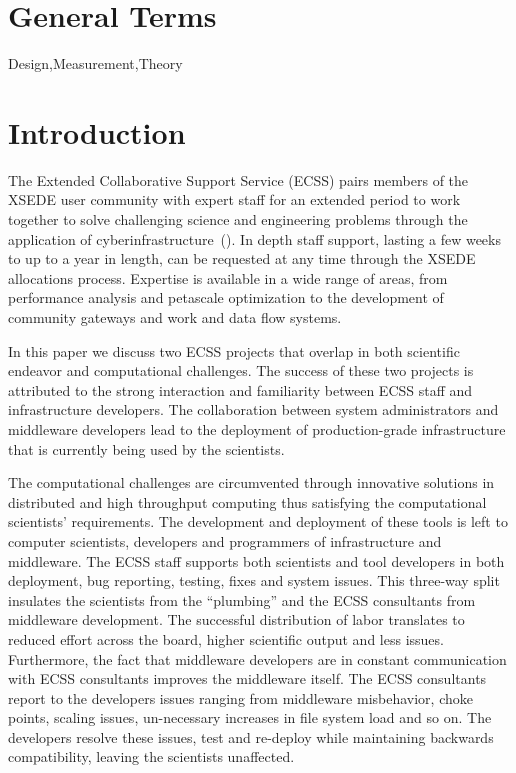 \documentclass{sig-alternate}
\begin{document}

\section*{General Terms}{Design,Measurement,Theory}

 \keywords{}

\section{Introduction}

The Extended Collaborative Support Service (ECSS) pairs members of the XSEDE
user community with expert staff for an extended period to work together to
solve challenging science and engineering problems through the application of
cyberinfrastructure~(\cite{ECSS_webpage}). In depth staff support, lasting a few
weeks to up to a year in length, can be requested at any time through the XSEDE
allocations process. Expertise is available in a wide range of areas, from
performance analysis and petascale optimization to the development of community
gateways and work and data flow systems.

In this paper we discuss two ECSS projects that overlap in both scientific
endeavor and computational challenges. The success of these two projects is
attributed to the strong interaction and familiarity between ECSS staff and
infrastructure developers. The collaboration between system administrators and
middleware developers lead to the deployment of production-grade infrastructure
that is currently being used by the scientists.

The computational challenges are circumvented through innovative solutions in
distributed and high throughput computing thus satisfying the computational
scientists' requirements. The development and deployment of these tools is left
to computer scientists, developers and programmers of infrastructure and
middleware. The ECSS staff supports both scientists and tool developers in both
deployment, bug reporting, testing, fixes and system issues. This three-way
split insulates the scientists from the ``plumbing'' and the ECSS consultants
from middleware development. The successful distribution of labor translates
to reduced effort across the board, higher scientific output and less issues.
Furthermore, the fact that middleware developers are in constant communication
with ECSS consultants improves the middleware itself. The ECSS consultants
report to the developers issues ranging from middleware misbehavior,
choke points, scaling issues, un-necessary increases in file system load and so
on. The developers resolve these issues, test and re-deploy while maintaining
backwards compatibility, leaving the scientists unaffected.
\end{document}
